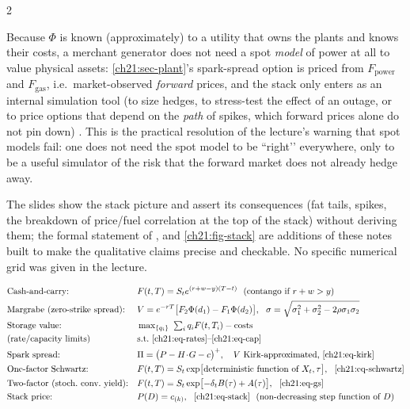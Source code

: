 \begin{paracol}{2}
\begin{finance}
Because $\Phi$ is known (approximately) to a utility that owns the plants and knows their costs, a merchant generator does not need a spot \emph{model} of power at all to
value physical assets: \cref{ch21:sec-plant}'s spark-spread option is priced from $F_{\mathrm{power}}$ and $F_{\mathrm{gas}}$, i.e.\ market-observed \emph{forward} prices, and
the stack only enters as an internal simulation tool (to size hedges, to stress-test the effect of an outage, or to price options that depend on the \emph{path} of spikes,
which forward prices alone do not pin down) . This is the practical resolution of the lecture's warning that spot models fail: one does not need the spot model
to be ``right’’ everywhere, only to be a useful simulator of the risk that the forward market does not already hedge away.
\end{finance}

\begin{coursenote}
The slides show the stack picture and assert its consequences (fat tails, spikes, the breakdown of price/fuel correlation at the top of the stack) without deriving them; the
formal statement of ,  and \cref{ch21:fig-stack} are additions of these notes built to make the qualitative claims precise and checkable.
No specific numerical grid was given in the lecture.
\end{coursenote}

\begin{keyformulas}
\small
\begin{align*}
&\text{Cash-and-carry:} && F(t,T)=S_te^{(r+w-y)(T-t)}\ \ (\text{contango if }r+w>y)\\
&\text{Margrabe (zero-strike spread):} && V=e^{-rT}\bigl[F_2\Phi(d_1)-F_1\Phi(d_2)\bigr],\ \ \sigma=\sqrt{\sigma_1^2+\sigma_2^2-2\rho\sigma_1\sigma_2}\\
&\text{Storage value:} && \max\nolimits_{\{q_i\}}\ \textstyle\sum_iq_iF(t,T_i)-\text{costs}\\
&\text{(rate/capacity limits)} && \text{s.t.\ }\eqref{ch21:eq-rates}\text{--}\eqref{ch21:eq-cap}\\
&\text{Spark spread:} && \Pi=\bigl(P-H\!\cdot\!G-c\bigr)^+,\quad V\ \text{Kirk-approximated,~}\eqref{ch21:eq-kirk}\\
&\text{One-factor Schwartz:} && F(t,T)=S_t\exp\bigl[\text{deterministic function of }X_t,\tau\bigr],\ \ \eqref{ch21:eq-schwartz}\\
&\text{Two-factor (stoch.\ conv.\ yield):} && F(t,T)=S_t\exp\bigl[-\delta_tB(\tau)+A(\tau)\bigr],\ \ \eqref{ch21:eq-gs}\\
&\text{Stack price:} && P(D)=c_{(k)},\ \ \eqref{ch21:eq-stack}\ \ (\text{non-decreasing step function of }D)
\end{align*}
\end{keyformulas}


\end{paracol}
